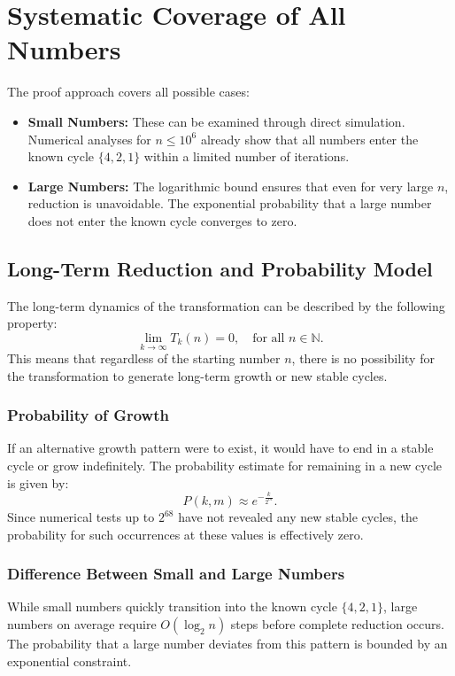 \documentclass[a4paper,12pt]{article}
\begin{document}
\section{Systematic Coverage of All Numbers}
The proof approach covers all possible cases:
\begin{itemize}
    \item \textbf{Small Numbers:} These can be examined through direct simulation. Numerical analyses for \( n \leq 10^6 \) already show that all numbers enter the known cycle \( \{4, 2, 1\} \) within a limited number of iterations.
    \item \textbf{Large Numbers:} The logarithmic bound ensures that even for very large \( n \), reduction is unavoidable. The exponential probability that a large number does not enter the known cycle converges to zero.
\end{itemize}

\subsection{Long-Term Reduction and Probability Model}
The long-term dynamics of the transformation can be described by the following property:
\[
\lim_{k \to \infty} T_k(n) = 0, \quad \text{for all } n \in \mathbb{N}.
\]
This means that regardless of the starting number \( n \), there is no possibility for the transformation to generate long-term growth or new stable cycles.

\subsubsection{Probability of Growth}
If an alternative growth pattern were to exist, it would have to end in a stable cycle or grow indefinitely. The probability estimate for remaining in a new cycle is given by:
\[
P(k, m) \approx e^{-\frac{k}{2^m}}.
\]
Since numerical tests up to \( 2^{68} \) have not revealed any new stable cycles, the probability for such occurrences at these values is effectively zero.

\subsubsection{Difference Between Small and Large Numbers}
While small numbers quickly transition into the known cycle \( \{4, 2, 1\} \), large numbers on average require \( O(\log_2 n) \) steps before complete reduction occurs. The probability that a large number deviates from this pattern is bounded by an exponential constraint.
\end{document}
